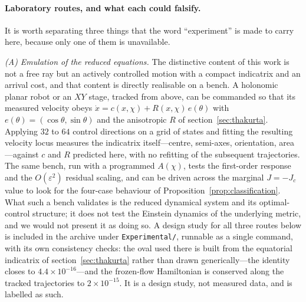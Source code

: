 \documentclass[12pt]{iopart}
\theoremstyle{plain}
\theoremstyle{definition}
\theoremstyle{remark}
\begin{document}
\paragraph{Laboratory routes, and what each could falsify.} It is worth separating
three things that the word ``experiment'' is made to carry here, because only one of
them is unavailable.

\emph{(A) Emulation of the reduced equations.} The distinctive content of this work
is not a free ray but an actively controlled motion with a compact indicatrix and an
arrival cost, and that content is directly realisable on a bench. A holonomic planar
robot or an $XY$ stage, tracked from above, can be commanded so that its measured
velocity obeys $\dot x=c(x,\chi)+R(x,\chi)\,e(\theta)$ with $e(\theta)=(\cos\theta,
\sin\theta)$ and the anisotropic $R$ of section~\ref{sec:thakurta}. Applying $32$ to
$64$ control directions on a grid of states and fitting the resulting velocity locus
measures the indicatrix itself---centre, semi-axes, orientation, area---against $c$
and $R$ predicted here, with no refitting of the subsequent trajectories. The same
bench, run with a programmed $A(\chi)$, tests the first-order response and the
$O(\varepsilon^2)$ residual scaling, and can be driven across the marginal $J=-J_c$
value to look for the four-case behaviour of Proposition~\ref{prop:classification}.
What such a bench validates is the reduced dynamical system and its optimal-control
structure; it does not test the Einstein dynamics of the underlying metric, and we
would not present it as doing so. A design study for all three routes below is
included in the archive under \texttt{Experimental/}, runnable as a single command,
with its own consistency checks: the oval used there is built from the equatorial
indicatrix of section~\ref{sec:thakurta} rather than drawn generically---the
identity closes to $4.4\times10^{-16}$---and the frozen-flow Hamiltonian is
conserved along the tracked trajectories to $2\times10^{-15}$. It is a design study,
not measured data, and is labelled as such.
\end{document}
